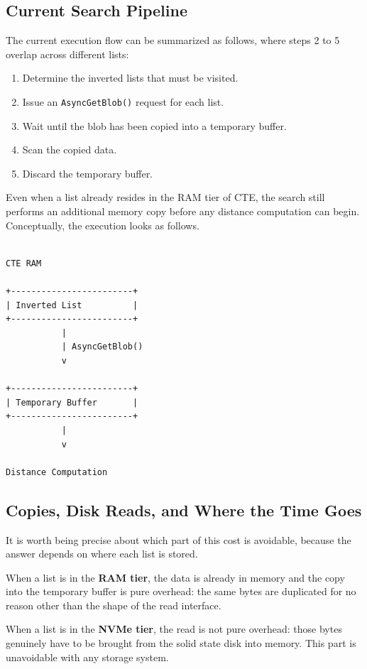 \documentclass[11pt]{article}
\begin{document}
\subsection{Current Search Pipeline}

The current execution flow can be summarized as follows, where steps 2
to 5 overlap across different lists:

\begin{enumerate}
\item Determine the inverted lists that must be visited.
\item Issue an \texttt{AsyncGetBlob()} request for each list.
\item Wait until the blob has been copied into a temporary buffer.
\item Scan the copied data.
\item Discard the temporary buffer.
\end{enumerate}

Even when a list already resides in the RAM tier of CTE, the search
still performs an additional memory copy before any distance
computation can begin. Conceptually, the execution looks as follows.

\begin{verbatim}

CTE RAM

+------------------------+
| Inverted List          |
+------------------------+
           |
           | AsyncGetBlob()
           v

+------------------------+
| Temporary Buffer       |
+------------------------+
           |
           v

Distance Computation

\end{verbatim}

\subsection{Copies, Disk Reads, and Where the Time Goes}

It is worth being precise about which part of this cost is avoidable,
because the answer depends on where each list is stored.

When a list is in the \textbf{RAM tier}, the data is already in memory
and the copy into the temporary buffer is pure overhead: the same
bytes are duplicated for no reason other than the shape of the read
interface.

When a list is in the \textbf{NVMe tier}, the read is not pure
overhead: those bytes genuinely have to be brought from the solid
state disk into memory. This part is unavoidable with any storage
system.
\end{document}
